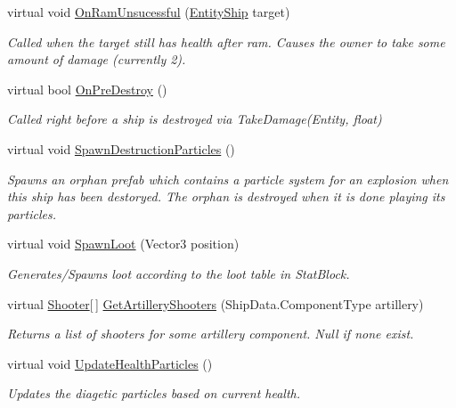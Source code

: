 \begin{DoxyCompactItemize}
\item 
virtual void \hyperlink{class_skyrates_1_1_client_1_1_entity_1_1_entity_ship_a63408dee1b3e0ed265034e5f6694bae0}{On\-Ram\-Unsucessful} (\hyperlink{class_skyrates_1_1_client_1_1_entity_1_1_entity_ship}{Entity\-Ship} target)
\begin{DoxyCompactList}\small\item\em Called when the target still has health after ram. Causes the owner to take some amount of damage (currently 2). \end{DoxyCompactList}\item 
virtual bool \hyperlink{class_skyrates_1_1_client_1_1_entity_1_1_entity_ship_a5db231429a55f458d4ae3e9f3db2f3f3}{On\-Pre\-Destroy} ()
\begin{DoxyCompactList}\small\item\em Called right before a ship is destroyed via Take\-Damage(\-Entity, float) \end{DoxyCompactList}\item 
virtual void \hyperlink{class_skyrates_1_1_client_1_1_entity_1_1_entity_ship_a5e3dc351137853c425478e0227fa59e5}{Spawn\-Destruction\-Particles} ()
\begin{DoxyCompactList}\small\item\em Spawns an orphan prefab which contains a particle system for an explosion when this ship has been destoryed. The orphan is destroyed when it is done playing its particles. \end{DoxyCompactList}\item 
virtual void \hyperlink{class_skyrates_1_1_client_1_1_entity_1_1_entity_ship_ae1ad3dab6502ebde62319cd39d4fd18c}{Spawn\-Loot} (Vector3 position)
\begin{DoxyCompactList}\small\item\em Generates/\-Spawns loot according to the loot table in Stat\-Block. \end{DoxyCompactList}\item 
virtual \hyperlink{class_skyrates_1_1_client_1_1_mono_1_1_shooter}{Shooter}\mbox{[}$\,$\mbox{]} \hyperlink{class_skyrates_1_1_client_1_1_entity_1_1_entity_ship_ae647437ac479d1758cf5ad5a80c4f89c}{Get\-Artillery\-Shooters} (Ship\-Data.\-Component\-Type artillery)
\begin{DoxyCompactList}\small\item\em Returns a list of shooters for some artillery component. Null if none exist. \end{DoxyCompactList}\item 
virtual void \hyperlink{class_skyrates_1_1_client_1_1_entity_1_1_entity_ship_afcebfc228689330fabbbc92a3147bd6e}{Update\-Health\-Particles} ()
\begin{DoxyCompactList}\small\item\em Updates the diagetic particles based on current health. \end{DoxyCompactList}\end{DoxyCompactItemize}
